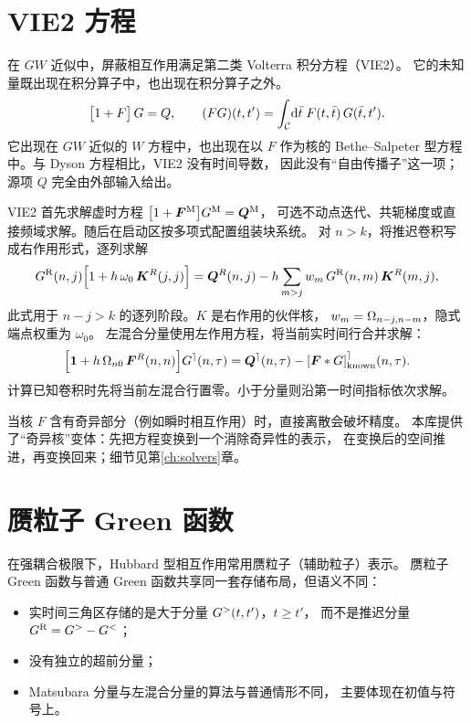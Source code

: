 \section{VIE2 方程}
\label{sec:vie2}

在 $GW$ 近似中，屏蔽相互作用满足第二类 Volterra 积分方程（VIE2）。
它的未知量既出现在积分算子中，也出现在积分算子之外。
\begin{equation}
    \big[1+F\big]\,G = Q,
    \qquad
    (F G)(t,t') = \int_{\mathcal{C}}\!\mathrm{d}\bar t\;
        F(t,\bar t)\,G(\bar t,t').
    \label{eq:vie2}
\end{equation}
它出现在 $GW$ 近似的 $W$ 方程中，也出现在以 $F$ 作为核的
Bethe--Salpeter 型方程中。与 Dyson 方程相比，VIE2 没有时间导数，
因此没有“自由传播子”这一项；源项 $Q$ 完全由外部输入给出。

VIE2 首先求解虚时方程 $\big[1+\bm{F}^{\mathrm{M}}\big]G^{\mathrm{M}} = \bm{Q}^{\mathrm{M}}$，
可选不动点迭代、共轭梯度或直接频域求解。随后在启动区按多项式配置组装块系统。
对 $n>k$，将推迟卷积写成右作用形式，逐列求解
          \begin{equation}
              G^{\mathrm{R}}(n,j)\Big[1 + h\,\omega_0\,\bm{K}^{R}(j,j)\Big]
              =
              \bm{Q}^{R}(n,j)
              -
              h\sum_{m>j} w_{m}\,
                G^{\mathrm{R}}(n,m)\,\bm{K}^{R}(m,j),
              \label{eq:vie2-ret}
          \end{equation}
          此式用于 $n-j>k$ 的逐列阶段。$K$ 是右作用的伙伴核，
          $w_m=\Omega_{n-j,n-m}$，隐式端点权重为 $\omega_0$。
          左混合分量使用左作用方程，将当前实时间行合并求解：
          \begin{equation}
              \Big[\bm{1} + h\,\Omega_{n0}\,\bm{F}^{R}(n,n)\Big]G^{\rceil}(n,\tau)
              =
              \bm{Q}^{\rceil}(n,\tau)
              - [\bm{F}*G]^{\rceil}_{\mathrm{known}}(n,\tau).
              \label{eq:vie2-lmix}
          \end{equation}
          计算已知卷积时先将当前左混合行置零。小于分量则沿第一时间指标依次求解。

当核 $F$ 含有奇异部分（例如瞬时相互作用）时，直接离散会破坏精度。
本库提供了“奇异核”变体：先把方程变换到一个消除奇异性的表示，
在变换后的空间推进，再变换回来；细节见第\ref{ch:solvers}章。

\section{赝粒子 Green 函数}
\label{sec:pseudo}

在强耦合极限下，Hubbard 型相互作用常用赝粒子（辅助粒子）表示。
赝粒子 Green 函数与普通 Green 函数共享同一套存储布局，但语义不同：
\begin{itemize}
    \item 实时间三角区存储的是大于分量 $G^{>}(t,t')$，$t\ge t'$，
          而不是推迟分量 $G^{\mathrm{R}}=G^{>}-G^{<}$；
    \item 没有独立的超前分量；
    \item Matsubara 分量与左混合分量的算法与普通情形不同，
          主要体现在初值与符号上。
\end{itemize}

